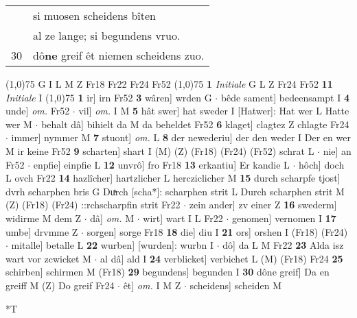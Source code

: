 \documentclass[8pt,a4paper,notitlepage]{article}
\begin{document}
\begin{table}[ht]
\begin{minipage}[t]{0.5\linewidth}
\begin{tabular}{rl}
 & si muosen scheidens bîten\\ 
 & al ze lange; si begundens vruo.\\ 
30 & dô\textbf{ne} greif êt niemen scheidens zuo.\\ 
\end{tabular}
\scriptsize
\line(1,0){75} \newline
G I L M Z Fr18 Fr22 Fr24 Fr52 \newline
\line(1,0){75} \newline
\textbf{1} \textit{Initiale} G L Z Fr24 Fr52  \textbf{11} \textit{Initiale} I  \newline
\line(1,0){75} \newline
\textbf{1} ir] irn Fr52 \textbf{3} wâren] wrden G  $\cdot$ bêde sament] bedeensampt I \textbf{4} unde] \textit{om.} Fr52  $\cdot$ vil] \textit{om.} I M \textbf{5} hât swer] hat sweder I [Hatwer]: Hat wer L Hatte wer M  $\cdot$ behalt dâ] bihielt da M da beheldet Fr52 \textbf{6} klaget] clagtez Z chlagte Fr24  $\cdot$ immer] nymmer M \textbf{7} stuont] \textit{om.} L \textbf{8} der newederiu] der den weder I Der en wer M ir keine Fr52 \textbf{9} scharten] shart I (M) (Z) (Fr18) (Fr24) (Fr52) schrat L  $\cdot$ nie] an Fr52  $\cdot$ enpfie] einpfie L \textbf{12} unvrô] fro Fr18 \textbf{13} erkantiu] Er kandie L  $\cdot$ hôch] doch L ovch Fr22 \textbf{14} hazlîcher] hartzlicher L hercziclicher M \textbf{15} durch scharpfe tjost] dvrh scharphen bris G Duͯrch [scha*]: scharphen strit L Durch scharphen strit M (Z) (Fr18) (Fr24) ::rchscharpfin strit Fr22  $\cdot$ zein ander] zv einer Z \textbf{16} swederm] widirme M dem Z  $\cdot$ dâ] \textit{om.} M  $\cdot$ wirt] wart I L Fr22  $\cdot$ genomen] vernomen I \textbf{17} umbe] drvmme Z  $\cdot$ sorgen] sorge Fr18 \textbf{18} die] diu I \textbf{21} ors] orshen I (Fr18) (Fr24)  $\cdot$ mitalle] betalle L \textbf{22} wurben] [wurden]: wurbn I  $\cdot$ dô] da L M Fr22 \textbf{23} Alda isz wart vor zcwicket M  $\cdot$ al dâ] ald I \textbf{24} verblicket] verbichet L (M) (Fr18) Fr24 \textbf{25} schirben] schirmen M (Fr18) \textbf{29} begundens] begunden I \textbf{30} dône greif] Da en greiff M (Z) Do greif Fr24  $\cdot$ êt] \textit{om.} I M Z  $\cdot$ scheidens] scheiden M \newline
\end{minipage}
\hspace{0.5cm}
\begin{minipage}[t]{0.5\linewidth}
\small
\begin{center}*T
\end{center}
\begin{tabular}{rl}

\end{tabular}
\end{minipage}
\end{table}
\end{document}
